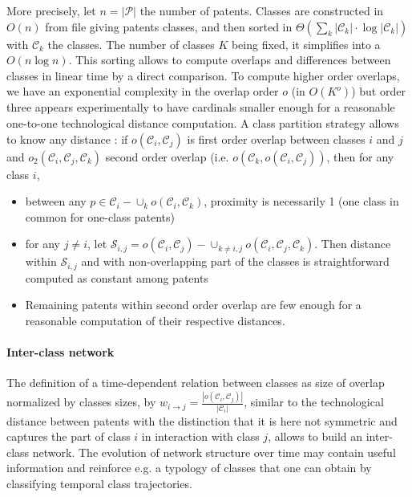 More precisely, let $n = \left|\mathcal{P}\right|$ the number of patents. Classes are constructed in $O(n)$ from file giving patents classes, and then sorted in $\Theta (\sum_k{\left|\mathcal{C}_k\right|\cdot \log{\left|\mathcal{C}_k\right|}})$ with $\mathcal{C}_k$ the classes. The number of classes $K$ being fixed, it simplifies into a $O(n\log{n})$. This sorting allows to compute overlaps and differences between classes in linear time by a direct comparison. To compute higher order overlaps, we have an exponential complexity in the overlap order $o$ (in $O(K^o)$) but order three appears experimentally to have cardinals smaller enough for a reasonable one-to-one technological distance computation. A class partition strategy allows to know any distance : if $o (\mathcal{C}_i,\mathcal{C}_j)$ is first order overlap between classes $i$ and $j$ and $o_2 (\mathcal{C}_i,\mathcal{C}_j,\mathcal{C}_k)$ second order overlap (i.e. $o(\mathcal{C}_k,o(\mathcal{C}_i,\mathcal{C}_j))$, then for any class $i$,
\begin{itemize}
\item between any $p\in \mathcal{C}_i - \cup_{k}{o(\mathcal{C}_i,\mathcal{C}_k)}$, proximity is necessarily 1 (one class in common for one-class patents)
\item for any $j \neq i$, let $\mathcal{S}_{i,j} = o(\mathcal{C}_i,\mathcal{C}_j) - \cup_{k\neq i,j} o(\mathcal{C}_i,\mathcal{C}_j,\mathcal{C}_k)$. Then distance within $\mathcal{S}_{i,j}$ and with non-overlapping part of the classes is straightforward computed as constant among patents
\item Remaining patents within second order overlap are few enough for a reasonable computation of their respective distances.
\end{itemize}


\paragraph{Inter-class network}

The definition of a time-dependent relation between classes as size of overlap normalized by classes sizes, by $w_{i\rightarrow j} = \frac{\left| o(\mathcal{C}_i,\mathcal{C}_j) \right|}{\left| \mathcal{C}_i\right|}$, similar to the technological distance between patents with the distinction that it is here not symmetric and captures the part of class $i$ in interaction with class $j$, allows to build an inter-class network. The evolution of network structure over time may contain useful information and reinforce e.g. a typology of classes that one can obtain by classifying temporal class trajectories.


